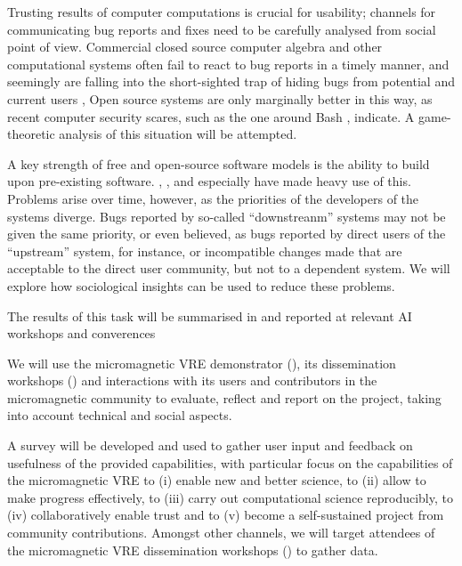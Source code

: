 \begin{workpackage}[id=social-aspects,wphases=0-48,
  title=Social Aspects,
  lead=UO,
  UORM=23,USHRM=8,USORM=6]
\begin{tasklist}
\begin{task}[title=Mechanism Design for free software development,pm=15,lead=UO,
id=isocial-decisionmaking]
 Trusting results of computer computations is crucial for
usability; channels for communicating bug reports and fixes need to be
carefully analysed from social point of view.  Commercial closed
source computer algebra and other computational systems often fail to
react to bug reports in a timely manner, and seemingly are falling
into the short-sighted trap of hiding bugs from potential and current
users \cite{misfort}, Open source systems are only marginally better
in this way, as recent computer security scares, such as the one
around Bash \cite{shellshock}, indicate.  A game-theoretic analysis of
this situation will be attempted.


A key strength of free and open-source software models is the ability
to build upon pre-existing software. \GAP, \PariGP, \Singular and
especially \Sage have made heavy use of this. Problems arise over
time, however, as the priorities of the developers of the systems
diverge. Bugs reported by so-called ``downstreanm'' systems may not be
given the same priority, or even believed, as bugs reported by direct
users of the ``upstream'' system, for instance, or incompatible
changes made that are acceptable to the direct user community, but not
to a dependent system. We will explore how sociological insights can
be used to reduce these problems.

The results of this task will be summarised in 
and reported at relevant AI workshops and converences
\end{task}

\begin{task}[title=Evaluation of Micromagnetic VRE,lead=USO,PM=6,
id=oommf-nb-evaluation,partners={UO,PS}]
  We will use the micromagnetic VRE demonstrator
  (), its dissemination
  workshops \linebreak()
  and interactions with its users and contributors in the
  micromagnetic community to evaluate, reflect and report on the project,
  taking into account technical and social aspects.

  A survey will be developed and used to gather user input and
  feedback on usefulness of the provided capabilities, with particular
  focus on the capabilities of the micromagnetic VRE to (i) enable new
  and better science, to (ii) allow to make progress effectively, to
  (iii) carry out computational science reproducibly, to (iv)
  collaboratively enable trust and to (v) become a self-sustained
  project from community contributions. Amongst other channels, we
  will target attendees of the micromagnetic VRE dissemination
  workshops () to
  gather data.


\end{task}
\end{tasklist}
\end{workpackage}
